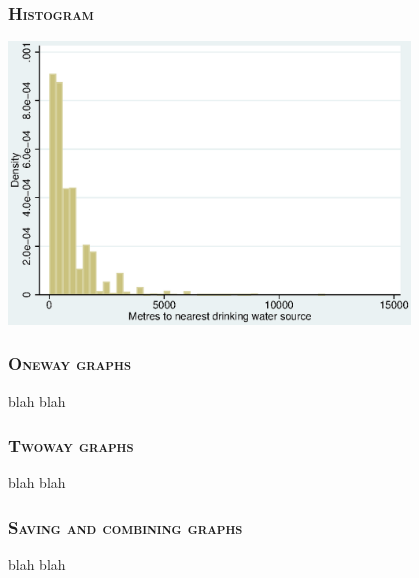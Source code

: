 \documentclass[10pt]{beamer}
\begin{document}
	
	\begin{frame}
	\frametitle{\textsc{Histogram}}
\begin{center}
    \includegraphics[width=0.8\textwidth]{stata_workshop_for_govt_officials_4.eps}
\end{center}
	\end{frame}
	
	\begin{frame}
	\frametitle{\textsc{Oneway graphs}}
	blah blah
	\end{frame}

	\begin{frame}
	\frametitle{\textsc{Twoway graphs}}
	blah blah
	\end{frame}
	
	\begin{frame}
	\frametitle{\textsc{Saving and combining graphs}}
	blah blah
	\end{frame}



	
\end{document}
